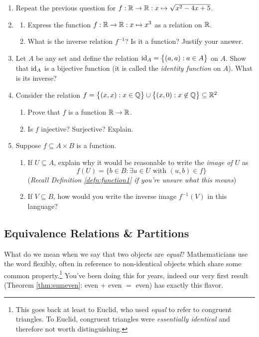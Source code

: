 \begin{exercises}{}{}
\begin{enumerate}
  
  \item Repeat the previous question for $f:\mathbb{R}\to\mathbb{R}:x\mapsto \sqrt{x^2-4x+5}$.
  
  
  \item\begin{enumerate}
    \item Express the function $f:\mathbb{R}\to\mathbb{R}:x\mapsto x^3$ as a relation on $\mathbb{R}$.
    \item What is the inverse relation $f^{-1}$? Is it a function? Justify your answer.
  \end{enumerate} 
  
  
  \item	Let $A$ be any set and define the relation $\operatorname{id}_A=\bigl\{(a,a):a\in A\bigr\}$ on $A$. Show that $\operatorname{id}_A$ is a bijective function (it is called the \emph{identity function} on $A$). What is its inverse?

  
  \item Consider the relation $f=\bigl\{(x,x):x\in\mathbb{Q}\bigr\}\cup\bigl\{(x,0):x\not\in\mathbb{Q}\bigr\} \subseteq \mathbb{R}^2$
  \begin{enumerate}
    \item Prove that $f$ is a function $\mathbb{R}\to\mathbb{R}$.
    \item Is $f$ injective? Surjective? Explain.
  \end{enumerate}
  
    
  \item Suppose $f\subseteq A\times B$ is a function.
  \begin{enumerate}
    \item If $U\subseteq A$, explain why it would be reasonable to write the \emph{image of $U$}  as
    \[
    	f(U)=\bigl\{ b\in B:\exists u\in U\text{ with }(u,b)\in f\bigr\}
    \]
    (\emph{Recall Definition \ref{defn:function1} if you're unsure what this means})
    \item If $V\subseteq B$, how would you write the inverse image $f^{-1}(V)$ in this language?
  \end{enumerate}
\end{enumerate}

\end{exercises}

\clearpage


\subsection{Equivalence Relations \& Partitions}\label{sec:equiv}


What do we mean when we say that two objects are \emph{equal}? Mathematicians use the word flexibly, often in reference to non-identical objects which share some common property.\footnote{This goes back at least to Euclid, who used \emph{equal} to refer to congruent triangles. To Euclid, congruent triangles were \emph{essentially identical} and therefore not worth distinguishing.} You've been doing this for years, indeed our very first result (Theorem \ref{thm:sumeven}: even + even $=$ even) has exactly this flavor.\smallbreak

